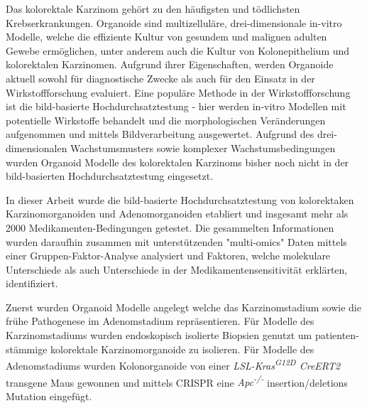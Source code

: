 Das kolorektale Karzinom gehört zu den häufigsten und tödlichsten Krebserkrankungen. Organoide sind multizelluläre, drei-dimensionale in-vitro Modelle, welche die effiziente Kultur von gesundem und malignen adulten Gewebe ermöglichen, unter anderem auch die Kultur von Kolonepithelium und kolorektalen Karzinomen. Aufgrund ihrer Eigenschaften, werden Organoide aktuell sowohl für diagnostische Zwecke als auch für den Einsatz in der Wirkstoffforschung evaluiert. Eine populäre Methode in der Wirkstoffforschung ist die bild-basierte Hochdurchsatztestung - hier werden in-vitro Modellen mit potentielle Wirkstoffe behandelt und die morphologischen Veränderungen aufgenommen und mittels Bildverarbeitung ausgewertet. Aufgrund des drei-dimensionalen Wachstumsmusters sowie komplexer Wachstumsbedingungen wurden Organoid Modelle des kolorektalen Karzinoms bisher noch nicht in der bild-basierten Hochdurchsatztestung eingesetzt. 
\bigbreak

In dieser Arbeit wurde die bild-basierte Hochdurchsatztestung von kolorektaken Karzinomorganoiden und Adenomorganoiden etabliert und insgesamt mehr als 2000 Medikamenten-Bedingungen getestet. Die gesammelten Informationen wurden daraufhin zusammen mit unterstützenden "multi-omics" Daten mittels einer Gruppen-Faktor-Analyse analysiert und Faktoren, welche molekulare Unterschiede als auch Unterschiede in der Medikamentensensitivität erklärten, identifiziert.
\bigbreak

Zuerst wurden Organoid Modelle angelegt welche das Karzinomstadium sowie die frühe Pathogenese im Adenomstadium repräsentieren. Für Modelle des Karzinomstadiums wurden endoskopisch isolierte Biopsien genutzt um patienten-stämmige kolorektale Karzinomorganoide zu isolieren. Für Modelle des Adenomstadiums wurden Kolonorganoide von einer \textit{LSL-Kras\textsuperscript{G12D} CreERT2} transgene Maus gewonnen und mittels CRISPR eine  \textit{Apc\textsuperscript{-/-}} insertion/deletions Mutation eingefügt.
\bigbreak

